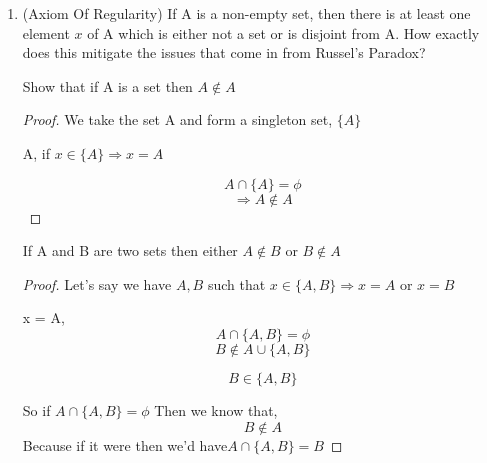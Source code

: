 \documentclass[11pt]{report}
\begin{document}
\begin{enumerate}
\begin{proof}
\begin{enumerate}
			      \item		      For the axiom of pair sets,

			            We define the property similarly $P(x)$ such that $x = a$ or $x = b$

			            For the axiom of pairwise unions,

			            We take $P(x)$ to be $x \in A$ or $x \in B$
			            For the axiom of specification,

			            We define a property $Q(x) : x \in A, P(x)$ is true.

			            Then we have,
			            \[
				            y \in \{x : x\in A, Q(x) \text{is true}\}
			            \]

			            This means that when $Q(y)$ is true, $y \in A $ $P(y)$ is true
			      \item For the axiom of replacement,
			            We define $Q(y): x \in A, P(x,y) is true$

			            $z \in \{y: Q(y) \text{ is true} \}\Leftrightarrow Q(z) \text{is true or } P(x,z) \text{is true}$
			      \item For the axiom of infinity,
			            We take the property $P(x)$ that $x$ is a natural number.
		      \end{enumerate}
	      \end{proof}

	\item (Axiom Of Regularity) If A is a non-empty set, then there is at least one element $x$ of A which is either not a set or is disjoint from A.
	      How exactly does this mitigate the issues that come in from Russel's Paradox?
	      \begin{prop}
		      Show that if A is a set then $A \notin A$
	      \end{prop}
	      \begin{proof}
		      We take the set A and form a singleton set, $\{A\}$

		      A, if $x \in \{A\} \Rightarrow x = A$

		      \[
			      A \cap \{A\} = \phi
		      \]
		      \[
			      \Rightarrow A \notin A
		      \]
	      \end{proof}
	      \begin{prop}
		      If A and B are two sets then either $A \notin B$ or $B \notin A$
	      \end{prop}
	      \begin{proof}
		      Let's say we have $A,B$ such that $x \in \{A,B\} \Rightarrow x = A$ or $x = B$

		      x = A,
		      \[
			      A \cap \{A,B\} = \phi
		      \]
		      \[
			      B \notin A \cup \{A,B\}
		      \]


		      \[
			      B \in \{A,B\}
		      \]

		      So if $A \cap \{A,B\} = \phi$
		      Then we know that,
		      \[
			      B \notin A
		      \]
		      Because if it were then we'd have$A \cap \{A,B\} = B$
	      \end{proof}

\end{enumerate}
\end{document}
